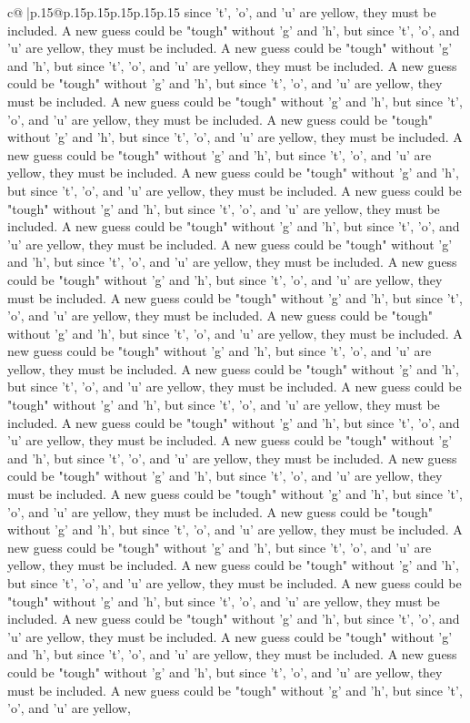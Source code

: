 \documentclass{article}
\begin{document}
{\begin{supertabular}{c@{$\;$}|p{.15\linewidth}@{}p{.15\linewidth}p{.15\linewidth}p{.15\linewidth}p{.15\linewidth}p{.15\linewidth}}
{{{since 't', 'o', and 'u' are yellow, they must be included. A new guess could be "tough" without 'g' and 'h', but since 't', 'o', and 'u' are yellow, they must be included. A new guess could be "tough" without 'g' and 'h', but since 't', 'o', and 'u' are yellow, they must be included. A new guess could be "tough" without 'g' and 'h', but since 't', 'o', and 'u' are yellow, they must be included. A new guess could be "tough" without 'g' and 'h', but since 't', 'o', and 'u' are yellow, they must be included. A new guess could be "tough" without 'g' and 'h', but since 't', 'o', and 'u' are yellow, they must be included. A new guess could be "tough" without 'g' and 'h', but since 't', 'o', and 'u' are yellow, they must be included. A new guess could be "tough" without 'g' and 'h', but since 't', 'o', and 'u' are yellow, they must be included. A new guess could be "tough" without 'g' and 'h', but since 't', 'o', and 'u' are yellow, they must be included. A new guess could be "tough" without 'g' and 'h', but since 't', 'o', and 'u' are yellow, they must be included. A new guess could be "tough" without 'g' and 'h', but since 't', 'o', and 'u' are yellow, they must be included. A new guess could be "tough" without 'g' and 'h', but since 't', 'o', and 'u' are yellow, they must be included. A new guess could be "tough" without 'g' and 'h', but since 't', 'o', and 'u' are yellow, they must be included. A new guess could be "tough" without 'g' and 'h', but since 't', 'o', and 'u' are yellow, they must be included. A new guess could be "tough" without 'g' and 'h', but since 't', 'o', and 'u' are yellow, they must be included. A new guess could be "tough" without 'g' and 'h', but since 't', 'o', and 'u' are yellow, they must be included. A new guess could be "tough" without 'g' and 'h', but since 't', 'o', and 'u' are yellow, they must be included. A new guess could be "tough" without 'g' and 'h', but since 't', 'o', and 'u' are yellow, they must be included. A new guess could be "tough" without 'g' and 'h', but since 't', 'o', and 'u' are yellow, they must be included. A new guess could be "tough" without 'g' and 'h', but since 't', 'o', and 'u' are yellow, they must be included. A new guess could be "tough" without 'g' and 'h', but since 't', 'o', and 'u' are yellow, they must be included. A new guess could be "tough" without 'g' and 'h', but since 't', 'o', and 'u' are yellow, they must be included. A new guess could be "tough" without 'g' and 'h', but since 't', 'o', and 'u' are yellow, they must be included. A new guess could be "tough" without 'g' and 'h', but since 't', 'o', and 'u' are yellow, they must be included. A new guess could be "tough" without 'g' and 'h', but since 't', 'o', and 'u' are yellow, they must be included. A new guess could be "tough" without 'g' and 'h', but since 't', 'o', and 'u' are yellow, they must be included. A new guess could be "tough" without 'g' and 'h', but since 't', 'o', and 'u' are yellow, they must be included. A new guess could be "tough" without 'g' and 'h', but since 't', 'o', and 'u' are yellow, they must be included. A new guess could be "tough" without 'g' and 'h', but since 't', 'o', and 'u' are yellow, }}}
\end{supertabular}}
\end{document}
